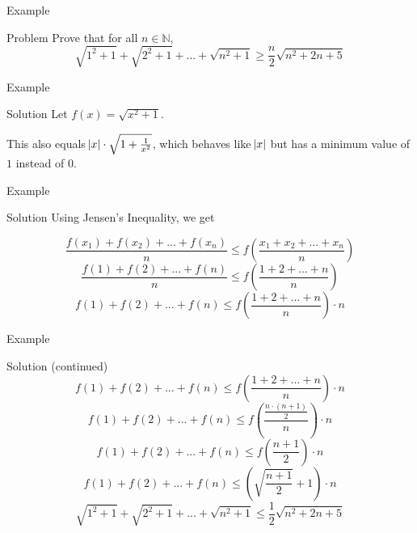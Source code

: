 \begin{namedframe}{Example}
	\begin{exampleblock}{Problem}
		Prove that for all $n \in \mathbb{N}$,
		\[\sqrt{1^2 + 1} + \sqrt{2^2 + 1} + ... + \sqrt{n^2 + 1} \geq \frac{n}{2}\sqrt{n^2 + 2n + 5}\]
	\end{exampleblock}
\end{namedframe}

\begin{namedframe}{Example}
	\begin{block}{Solution}
		Let $f(x) = \sqrt{x^2 + 1}$.
		
		This also equals $\abs{x}\cdot\sqrt{1 + \frac{1}{x^2}}$, which behaves like $\abs{x}$ but has a minimum value of $1$ instead of $0$.
	\end{block}
\end{namedframe}

\begin{namedframe}{Example}
	\begin{block}{Solution}
		Using Jensen's Inequality, we get

		\[\frac{f(x_1) + f(x_2) + ... + f(x_n)}{n} \leq f \left( \frac{x_1 + x_2 + ... + x_n}{n} \right ) \]
		\[\frac{f(1) + f(2) + ... + f(n)}{n} \leq f \left( \frac{1 + 2 + ... + n}{n} \right ) \]
		\[f(1) + f(2) + ... + f(n) \leq f \left( \frac{1 + 2 + ... + n}{n} \right ) \cdot n\]
	\end{block}
\end{namedframe}

\begin{namedframe}{Example}
	\begin{block}{Solution (continued)}
		\[f(1) + f(2) + ... + f(n) \leq f \left( \frac{1 + 2 + ... + n}{n} \right ) \cdot n\]
		\[f(1) + f(2) + ... + f(n) \leq f \left( \frac{ \frac{n\cdot(n+1)}{2} }{n} \right ) \cdot n\]
		\[f(1) + f(2) + ... + f(n) \leq f \left( \frac{n + 1}{2} \right ) \cdot n\]
		\[f(1) + f(2) + ... + f(n) \leq \left( \sqrt{\frac{n + 1}{2}} + 1 \right) \cdot n\]
		\[\sqrt{1^2 + 1} + \sqrt{2^2 + 1} + ... + \sqrt{n^2 + 1} \leq \frac{1}{2} \sqrt{n^2 + 2n + 5}\]
	\end{block}
\end{namedframe}
